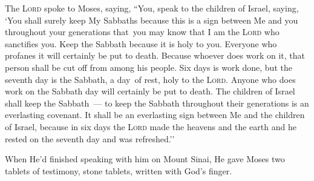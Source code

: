\begin{inparaenum}
     The \textsc{Lord} spoke to Moses, saying,%
     ``You, speak to the children of Israel, saying, `You shall surely keep My Sabbaths because this is a sign between Me and you throughout your generations that\understood\ you may know that I am the \textsc{Lord} who sanctifies you.%
     Keep the Sabbath because it is holy to you. Everyone who profanes it will certainly be put to death. Because whoever does work on it, that person shall be cut off from among his people.%
     Six days is work done, but the seventh day is the Sabbath, a day\understood\ of rest, holy to the \textsc{Lord}. Anyone who does work on the Sabbath day will certainly be put to death.%
     The children of Israel shall keep the Sabbath~--- to keep the Sabbath throughout their generations is an everlasting covenant.%
     It shall be an everlasting sign between Me and the children of Israel, because in six days the \textsc{Lord} made the heavens and the earth and he rested on the seventh day and was refreshed.''%
    
     When He'd finished speaking with him on Mount Sinai, He gave Moses two tablets of testimony, stone tablets, written with God's finger.%
\end{inparaenum}
